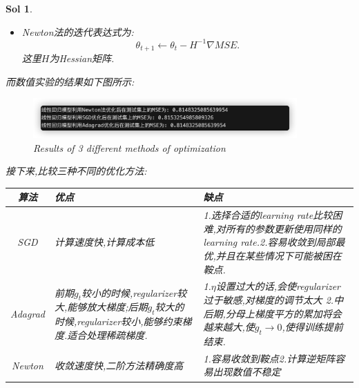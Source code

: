 \label{key}\documentclass[UTF8,a4paper,11pt]{ctexart}
\newtheorem{sol}{Sol}[section]
\begin{document}
\begin{sol}
\begin{itemize}
	\item Newton法的迭代表达式为:$$\theta_{t+1} \leftarrow \theta_{t}-H^{-1}\nabla MSE.$$这里$H$为Hessian矩阵.
\end{itemize}
而数值实验的结果如下图所示:
\begin{figure}[H]
	\centering
	\includegraphics[width=0.9\textwidth,height=0.2\textwidth]{result.png}
	\caption{Results of 3 different methods of optimization}
\end{figure}
接下来,比较三种不同的优化方法:\\
\begin{center}
	\begin{tabular}{c p{5cm} p{5cm}}
	
	\hline
	算法 & 优点 & 缺点 \\
	\hline
	SGD &计算速度快,计算成本低  & 1.选择合适的learning rate比较困难,对所有的参数更新使用同样的learning rate.2.容易收敛到局部最优,并且在某些情况下可能被困在鞍点.\\

	Adagrad & 前期$g_{t}$较小的时候,regularizer较大,能够放大梯度;后期$g_{t}$较大的时候,regularizer较小,能够约束梯度.适合处理稀疏梯度. & 1.$\eta$设置过大的话,会使regularizer过于敏感,对梯度的调节太大
	2.中后期,分母上梯度平方的累加将会越来越大,使$g_{t}\rightarrow 0$,使得训练提前结束.
	\\

	Newton & 收敛速度快,二阶方法精确度高 & 1.容易收敛到鞍点2.计算逆矩阵容易出现数值不稳定 \\
	\hline
\end{tabular}
\end{center}

\end{sol}
\newpage
\end{document}

